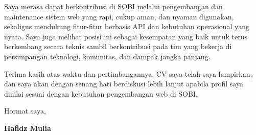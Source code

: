 \documentclass[a4paper,11pt]{article}
\begin{document}
Saya merasa dapat berkontribusi di SOBI melalui pengembangan dan maintenance sistem web yang rapi, cukup aman, dan nyaman digunakan, sekaligus mendukung fitur-fitur berbasis API dan kebutuhan operasional yang nyata. Saya juga melihat posisi ini sebagai kesempatan yang baik untuk terus berkembang secara teknis sambil berkontribusi pada tim yang bekerja di persimpangan teknologi, komunitas, dan dampak jangka panjang.

Terima kasih atas waktu dan pertimbangannya. CV saya telah saya lampirkan, dan saya akan dengan senang hati berdiskusi lebih lanjut apabila profil saya dinilai sesuai dengan kebutuhan pengembangan web di SOBI.

Hormat saya,

\vspace{12pt}

\textbf{Hafidz Mulia}
\end{document}

